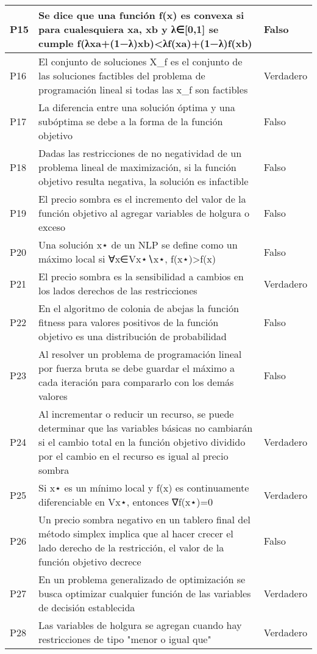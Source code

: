 \documentclass{article}
\begin{document}
\begin{longtable}{|>{\centering\arraybackslash}p{1.5cm}|>{\raggedright\arraybackslash}p{14cm}|>{\centering\arraybackslash}p{2cm}|}
\hline
P15 & Se dice que una función f(x) es convexa si para cualesquiera xa, xb y λ∈[0,1] se cumple f(λxa+(1−λ)xb)<λf(xa)+(1−λ)f(xb) & Falso \\
\hline
P16 & El conjunto de soluciones X\_f es el conjunto de las soluciones factibles del problema de programación lineal si todas las x\_f son factibles & Verdadero \\
\hline
P17 & La diferencia entre una solución óptima y una subóptima se debe a la forma de la función objetivo & Falso \\
\hline
P18 & Dadas las restricciones de no negatividad de un problema lineal de maximización, si la función objetivo resulta negativa, la solución es infactible & Falso \\
\hline
P19 & El precio sombra es el incremento del valor de la función objetivo al agregar variables de holgura o exceso & Falso \\
\hline
P20 & Una solución x⋆ de un NLP se define como un máximo local si ∀x∈Vx⋆∖x⋆, f(x⋆)>f(x) & Falso \\
\hline
P21 & El precio sombra es la sensibilidad a cambios en los lados derechos de las restricciones & Verdadero \\
\hline
P22 & En el algoritmo de colonia de abejas la función fitness para valores positivos de la función objetivo es una distribución de probabilidad & Falso \\
\hline
P23 & Al resolver un problema de programación lineal por fuerza bruta se debe guardar el máximo a cada iteración para compararlo con los demás valores & Falso \\
\hline
P24 & Al incrementar o reducir un recurso, se puede determinar que las variables básicas no cambiarán si el cambio total en la función objetivo dividido por el cambio en el recurso es igual al precio sombra & Verdadero \\
\hline
P25 & Si x⋆ es un mínimo local y f(x) es continuamente diferenciable en Vx⋆, entonces ∇f(x⋆)=0 & Verdadero \\
\hline
P26 & Un precio sombra negativo en un tablero final del método simplex implica que al hacer crecer el lado derecho de la restricción, el valor de la función objetivo decrece & Falso \\
\hline
P27 & En un problema generalizado de optimización se busca optimizar cualquier función de las variables de decisión establecida & Verdadero \\
\hline
P28 & Las variables de holgura se agregan cuando hay restricciones de tipo "menor o igual que" & Verdadero \\

\end{longtable}
\end{document}
